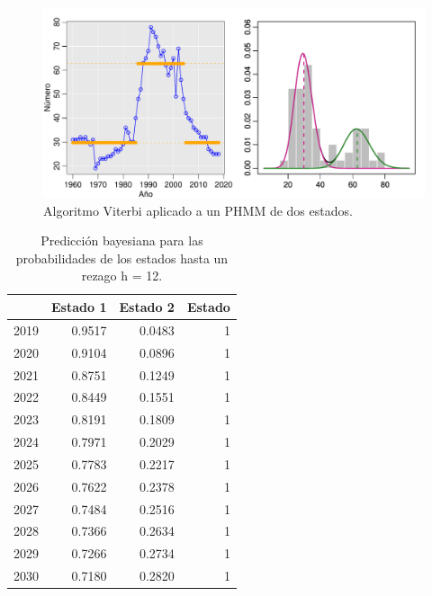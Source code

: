 \documentclass[a4paper]{article}\usepackage[]{graphicx}\usepackage[]{color}
\makeatletter
\def\maxwidth{ %
  \ifdim\Gin@nat@width>\linewidth
    \linewidth
  \else
    \Gin@nat@width
  \fi
}
\newenvironment{knitrout}{}{} %
\makeatother
\begin{document}
\begin{knitrout}
\color{fgcolor}\begin{figure}
\includegraphics[width=\maxwidth]{figure/unnamed-chunk-28-1} \caption[Algoritmo Viterbi aplicado a un PHMM de dos estados]{Algoritmo Viterbi aplicado a un PHMM de dos estados.}\label{fig:unnamed-chunk-28}
\end{figure}


\end{knitrout}

\begin{table}[ht]
\centering
\begin{tabular}{rrrr}
  \hline
 & Estado 1 & Estado 2 & Estado \\ 
  \hline
2019 & 0.9517 & 0.0483 &     1 \\ 
  2020 & 0.9104 & 0.0896 &     1 \\ 
  2021 & 0.8751 & 0.1249 &     1 \\ 
  2022 & 0.8449 & 0.1551 &     1 \\ 
  2023 & 0.8191 & 0.1809 &     1 \\ 
  2024 & 0.7971 & 0.2029 &     1 \\ 
  2025 & 0.7783 & 0.2217 &     1 \\ 
  2026 & 0.7622 & 0.2378 &     1 \\ 
  2027 & 0.7484 & 0.2516 &     1 \\ 
  2028 & 0.7366 & 0.2634 &     1 \\ 
  2029 & 0.7266 & 0.2734 &     1 \\ 
  2030 & 0.7180 & 0.2820 &     1 \\ 
   \hline
\end{tabular}
\caption{Predicción bayesiana para las probabilidades de los estados hasta un rezago h = 12.} 
\end{table}
\end{document}
